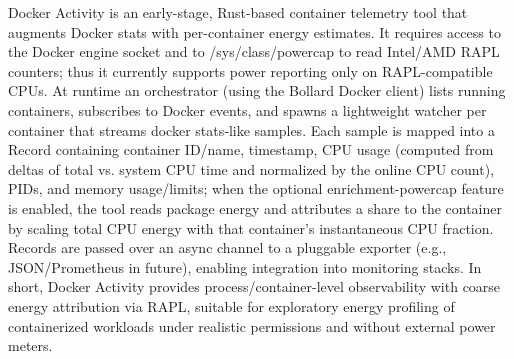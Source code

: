 Docker Activity is an early-stage, Rust-based container telemetry tool that augments Docker stats with per-container energy estimates. It requires access to the Docker engine socket and to /sys/class/powercap to read Intel/AMD RAPL counters; thus it currently supports power reporting only on RAPL-compatible CPUs. At runtime an orchestrator (using the Bollard Docker client) lists running containers, subscribes to Docker events, and spawns a lightweight watcher per container that streams docker stats‐like samples. Each sample is mapped into a Record containing container ID/name, timestamp, CPU usage (computed from deltas of total vs. system CPU time and normalized by the online CPU count), PIDs, and memory usage/limits; when the optional enrichment-powercap feature is enabled, the tool reads package energy and attributes a share to the container by scaling total CPU energy with that container’s instantaneous CPU fraction. Records are passed over an async channel to a pluggable exporter (e.g., JSON/Prometheus in future), enabling integration into monitoring stacks. In short, Docker Activity provides process/container-level observability with coarse energy attribution via RAPL, suitable for exploratory energy profiling of containerized workloads under realistic permissions and without external power meters.

